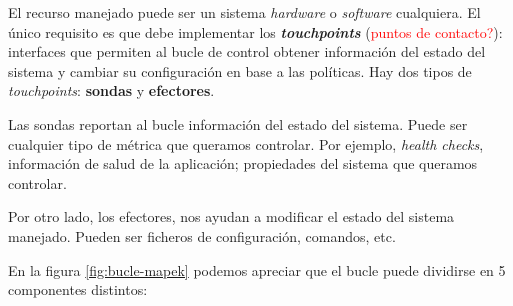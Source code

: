 El recurso manejado puede ser un sistema \emph{hardware} o \emph{software} cualquiera. El único requisito es que debe implementar los \textbf{\emph{touchpoints}} (\textcolor{red}{puntos de contacto?}): interfaces que permiten al bucle de control obtener información del estado del sistema y cambiar su configuración en base a las políticas. Hay dos tipos de \emph{touchpoints}: \textbf{sondas} y \textbf{efectores}.

Las sondas reportan al bucle información del estado del sistema. Puede ser cualquier tipo de métrica que queramos controlar. Por ejemplo, \emph{health checks}, información de salud de la aplicación; propiedades del sistema que queramos controlar.

Por otro lado, los efectores, nos ayudan a modificar el estado del sistema manejado. Pueden ser ficheros de configuración, comandos, etc.

En la figura \ref{fig:bucle-mapek} podemos apreciar que el bucle puede dividirse en 5 componentes distintos: \cite{ArchitecturalBlueprintAutonomic2006}

